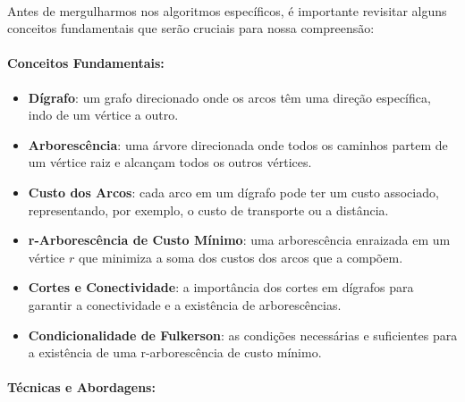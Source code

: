 \documentclass[12pt,a4paper]{article}
\begin{document}
\paragraph{}
Antes de mergulharmos nos algoritmos específicos, é importante revisitar alguns conceitos fundamentais que serão cruciais para nossa compreensão:

\paragraph{Conceitos Fundamentais:}
\begin{itemize}\setlength{\itemsep}{2pt}
    \item \textbf{Dígrafo}: um grafo direcionado onde os arcos têm uma direção específica, indo de um vértice a outro.
    \item \textbf{Arborescência}: uma árvore direcionada onde todos os caminhos partem de um vértice raiz e alcançam todos os outros vértices.
    \item \textbf{Custo dos Arcos}: cada arco em um dígrafo pode ter um custo associado, representando, por exemplo, o custo de transporte ou a distância.
    \item \textbf{r-Arborescência de Custo Mínimo}: uma arborescência enraizada em um vértice \(r\) que minimiza a soma dos custos dos arcos que a compõem.
    \item \textbf{Cortes e Conectividade}: a importância dos cortes em dígrafos para garantir a conectividade e a existência de arborescências.
    \item \textbf{Condicionalidade de Fulkerson}: as condições necessárias e suficientes para a existência de uma r-arborescência de custo mínimo.
\end{itemize}

\paragraph{Técnicas e Abordagens:}
\end{document}
